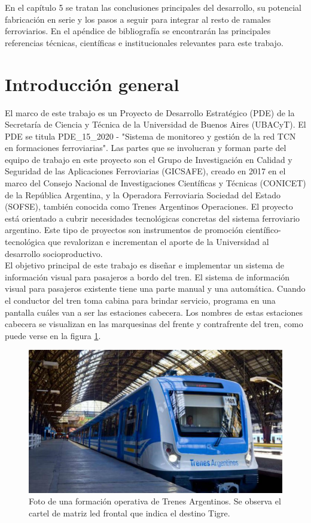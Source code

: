 En el capítulo 5 se tratan las conclusiones principales del desarrollo, su potencial fabricación en serie y los pasos a seguir para integrar al resto de ramales ferroviarios. En el apéndice de bibliografía se encontrarán las principales referencias técnicas, científicas e institucionales relevantes para este trabajo.\\


\pagebreak
\section{Introducción general}

El  marco de este trabajo es un Proyecto de Desarrollo Estratégico (PDE) de la Secretaría de Ciencia y Técnica de la Universidad de Buenos Aires (UBACyT). El PDE se titula PDE\_15\_2020 - "Sistema de monitoreo y gestión de la red TCN en formaciones ferroviarias". Las partes que se involucran y forman parte del equipo de trabajo en este proyecto son el Grupo de Investigación en Calidad y Seguridad de las Aplicaciones Ferroviarias (GICSAFE), creado en 2017 en el marco del Consejo Nacional de Investigaciones Científicas y Técnicas (CONICET) de la República Argentina, y la  Operadora Ferroviaria Sociedad del Estado (SOFSE), también conocida como Trenes Argentinos Operaciones. El proyecto está orientado a cubrir necesidades tecnológicas concretas del sistema ferroviario argentino. Este tipo de proyectos son instrumentos de promoción científico-tecnológica que revalorizan e incrementan el aporte de la Universidad al desarrollo socioproductivo.\\

El objetivo principal de este trabajo es diseñar e implementar un sistema de información visual para pasajeros a bordo del tren. El sistema de información visual para pasajeros existente tiene una parte manual y una automática. Cuando el conductor del tren toma cabina para brindar servicio, programa en una pantalla cuáles van a ser las estaciones cabecera. Los nombres de estas estaciones cabecera se visualizan en las marquesinas del frente y contrafrente del tren, como puede verse en la figura \ref{fig:tren}.

\begin{figure}[ht]
	\centering
	\includegraphics[width=1\textwidth]{./Figures/tren.jpg}
	\caption{Foto de una formación operativa de Trenes Argentinos. Se observa el cartel de matriz led frontal que indica el destino Tigre.}
	\label{fig:tren}
\end{figure}

